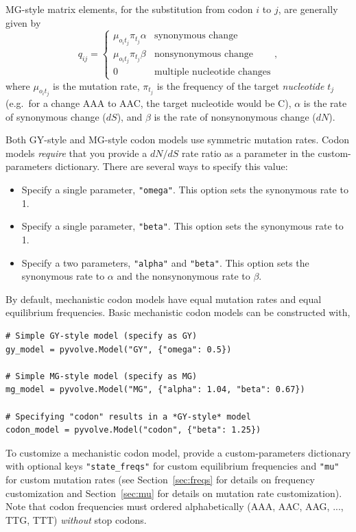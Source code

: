 \documentclass{article}
\newcommand{\code}[1]{\texttt{\small{#1}}}
\begin{document}
MG-style \citep{MG94} matrix elements, for the substitution from codon $i$ to $j$, are generally given by 
\begin{equation}\label{eq:MGstyle}
q_{ij} = \left\{ 
\begin{array}{rl}
\mu_{o_it_j}\pi_{t_j} \alpha         &\text{synonymous change} \\
\mu_{o_it_j}\pi_{t_j} \beta  &\text{nonsynonymous change} \\
0                             &\text{multiple nucleotide changes}       
\end{array} \right. ,
\end{equation}
where $\mu_{o_it_j}$ is the mutation rate, $\pi_{t_j}$ is the frequency of the target \emph{nucleotide} $t_j$ (e.g.\ for a change AAA to AAC, the target nucleotide would be C), $\alpha$ is the rate of synonymous change ($dS$), and $\beta$ is the rate of nonsynonymous change ($dN$).

Both GY-style and MG-style codon models use symmetric mutation rates. Codon models \emph{require} that you provide a $dN/dS$ rate ratio as a parameter in the custom-parameters dictionary. There are several ways to specify this value:
\begin{itemize}
	\item Specify a single parameter, \code{"omega"}. This option sets the synonymous rate to 1.
	\item Specify a single parameter, \code{"beta"}. This option sets the synonymous rate to 1.
	\item Specify a two parameters, \code{"alpha"} and \code{"beta"}. This option sets the synonymous rate to $\alpha$ and the nonsynonymous rate to $\beta$.
\end{itemize}

By default, mechanistic codon models have equal mutation rates and equal equilibrium frequencies. Basic mechanistic codon models can be constructed with,
\begin{lstlisting}
# Simple GY-style model (specify as GY)
gy_model = pyvolve.Model("GY", {"omega": 0.5})

# Simple MG-style model (specify as MG)
mg_model = pyvolve.Model("MG", {"alpha": 1.04, "beta": 0.67})

# Specifying "codon" results in a *GY-style* model
codon_model = pyvolve.Model("codon", {"beta": 1.25})
\end{lstlisting}

To customize a mechanistic codon model, provide a custom-parameters dictionary with optional keys \code{"state\_freqs"} for custom equilibrium frequencies and \code{"mu"} for custom mutation rates (see Section~\ref{sec:freqs} for details on frequency customization and Section~\ref{sec:mu} for details on mutation rate customization). Note that codon frequencies must ordered alphabetically (AAA, AAC, AAG, ..., TTG, TTT) \emph{without} stop codons.
\end{document}
